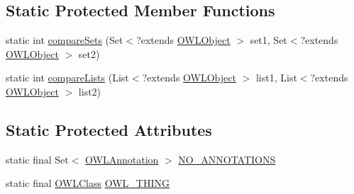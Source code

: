 \subsection*{Static Protected Member Functions}
\begin{DoxyCompactItemize}
\item 
static int \hyperlink{classuk_1_1ac_1_1manchester_1_1cs_1_1owl_1_1owlapi_1_1_o_w_l_object_impl_a878891bffe37236e57c59c150b5105d6}{compare\-Sets} (Set$<$?extends \hyperlink{interfaceorg_1_1semanticweb_1_1owlapi_1_1model_1_1_o_w_l_object}{O\-W\-L\-Object} $>$ set1, Set$<$?extends \hyperlink{interfaceorg_1_1semanticweb_1_1owlapi_1_1model_1_1_o_w_l_object}{O\-W\-L\-Object} $>$ set2)
\item 
static int \hyperlink{classuk_1_1ac_1_1manchester_1_1cs_1_1owl_1_1owlapi_1_1_o_w_l_object_impl_a43065ac9696c2f0eb3661205814a8890}{compare\-Lists} (List$<$?extends \hyperlink{interfaceorg_1_1semanticweb_1_1owlapi_1_1model_1_1_o_w_l_object}{O\-W\-L\-Object} $>$ list1, List$<$?extends \hyperlink{interfaceorg_1_1semanticweb_1_1owlapi_1_1model_1_1_o_w_l_object}{O\-W\-L\-Object} $>$ list2)
\end{DoxyCompactItemize}
\subsection*{Static Protected Attributes}
\begin{DoxyCompactItemize}
\item 
static final Set$<$ \hyperlink{interfaceorg_1_1semanticweb_1_1owlapi_1_1model_1_1_o_w_l_annotation}{O\-W\-L\-Annotation} $>$ \hyperlink{classuk_1_1ac_1_1manchester_1_1cs_1_1owl_1_1owlapi_1_1_o_w_l_object_impl_a2f3c594034e603531641652d54693fc9}{N\-O\-\_\-\-A\-N\-N\-O\-T\-A\-T\-I\-O\-N\-S}
\item 
static final \hyperlink{interfaceorg_1_1semanticweb_1_1owlapi_1_1model_1_1_o_w_l_class}{O\-W\-L\-Class} \hyperlink{classuk_1_1ac_1_1manchester_1_1cs_1_1owl_1_1owlapi_1_1_o_w_l_object_impl_aa113a934abbbaff56f746f1275d635a9}{O\-W\-L\-\_\-\-T\-H\-I\-N\-G}
\end{DoxyCompactItemize}
